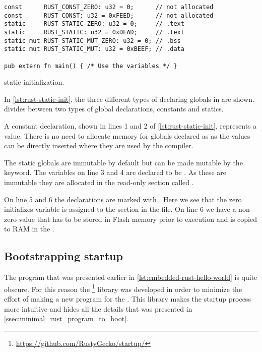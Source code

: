 \begin{listing}[H]
\begin{verbatim}
const      RUST_CONST_ZERO: u32 = 0;      // not allocated
const      RUST_CONST: u32 = 0xFEED;      // not allocated
static     RUST_STATIC_ZERO: u32 = 0;     // .text
static     RUST_STATIC: u32 = 0xDEAD;     // .text
static mut RUST_STATIC_MUT_ZERO: u32 = 0; // .bss
static mut RUST_STATIC_MUT: u32 = 0xBEEF; // .data

pub extern fn main() { /* Use the variables */ }
\end{verbatim}
\caption{{\rust} static initialization.}
\label{lst:rust-static-init}
\end{listing}

In \autoref{lst:rust-static-init}, the three different types of declaring globals in {\rust} are shown.
{\rust} divides between two types of global declarations, constants and statics.

A constant declaration, shown in lines 1 and 2 of \autoref{lst:rust-static-init}, represents a value.
There is no need to allocate memory for globals declared as  as the values can be directly inserted where they are used by the compiler.

The static globals are immutable by default but can be made mutable by the  keyword.
The variables on line 3 and 4 are declared to be .
As these are immutable they are allocated in the read-only section called .

On line 5 and 6 the declarations are marked with .
Here we see that the zero initializes variable is assigned to the  section in the {\elf} file.
On line 6 we have a non-zero value that has to be stored in Flash memory prior to execution and is copied to RAM in the .

\subsection{Bootstrapping startup}
\label{sec:startup}

The {\rust} program that was presented earlier in \autoref{lst:embedded-rust-hello-world} is quite obscure.
For this reason the  \footnote{\url{https://github.com/RustyGecko/startup/}} library was developed in order to minimize the effort of making a new {\rust} program for the {\gecko}.
This library makes the startup process more intuitive and hides all the details that was presented in \autoref{ssec:minimal_rust_program_to_boot}.

